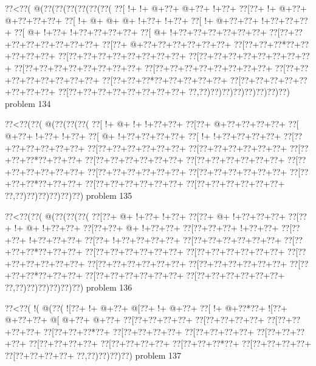 \vbox{\vbox{\goo
\0??<\0??(\- @(\0??(\0??(\0??(\0??(\0??(\0??(
\0??[\- !+\- !+\- @+\0??+\- @+\0??+\- !+\0??+
\0??[\0??+\- !+\- @+\0??+\- @+\0??+\0??+\0??+
\0??[\- !+\- @+\- @+\- @+\- !+\0??+\- !+\0??+
\0??[\- !+\- @+\0??+\0??+\- !+\0??+\0??+\0??+
\0??[\- @+\- !+\0??+\- !+\0??+\0??+\0??+\0??+
\0??[\- @+\- !+\0??+\0??+\0??+\0??+\0??+\0??+
\0??[\0??+\0??+\0??+\0??+\0??+\0??+\0??+\0??+
\0??[\0??+\- @+\0??+\0??+\0??+\0??+\0??+\0??+
\0??[\0??+\0??+\0??*\0??+\0??+\0??+\0??+\0??+
\0??[\0??+\0??+\0??+\0??+\0??+\0??+\0??+\0??+
\0??[\0??+\0??+\0??+\0??+\0??+\0??+\0??+\0??+
\0??[\0??+\0??+\0??+\0??+\0??+\0??+\0??+\0??+
\0??[\0??+\0??+\0??+\0??+\0??+\0??+\0??+\0??+
\0??[\0??+\0??+\0??+\0??+\0??+\0??+\0??+\0??+
\0??[\0??+\0??+\0??*\0??+\0??+\0??+\0??+\0??+
\0??[\0??+\0??+\0??+\0??+\0??+\0??+\0??+\0??+
\0??[\0??+\0??+\0??+\0??+\0??+\0??+\0??+\0??+
\0??,\0??)\0??)\0??)\0??)\0??)\0??)\0??)\0??)
}
\hfil problem 134\hfil\break
}

\vbox{\vbox{\goo
\0??<\0??(\0??(\- @(\0??(\0??(\0??(
\0??[\- !+\- @+\- !+\- !+\0??+\0??+
\0??[\0??+\- @+\0??+\0??+\0??+\0??+
\0??[\- @+\0??+\- !+\0??+\- !+\0??+
\0??[\- @+\- !+\0??+\0??+\0??+\0??+
\0??[\- !+\- !+\0??+\0??+\0??+\0??+
\0??[\0??+\0??+\0??+\0??+\0??+\0??+
\0??[\0??+\0??+\0??+\0??+\0??+\0??+
\0??[\0??+\0??+\0??+\0??+\0??+\0??+
\0??[\0??+\0??+\0??*\0??+\0??+\0??+
\0??[\0??+\0??+\0??+\0??+\0??+\0??+
\0??[\0??+\0??+\0??+\0??+\0??+\0??+
\0??[\0??+\0??+\0??+\0??+\0??+\0??+
\0??[\0??+\0??+\0??+\0??+\0??+\0??+
\0??[\0??+\0??+\0??+\0??+\0??+\0??+
\0??[\0??+\0??+\0??*\0??+\0??+\0??+
\0??[\0??+\0??+\0??+\0??+\0??+\0??+
\0??[\0??+\0??+\0??+\0??+\0??+\0??+
\0??,\0??)\0??)\0??)\0??)\0??)\0??)
}
\hfil problem 135\hfil\break
}

\vbox{\vbox{\goo
\0??<\0??(\0??(\- @(\0??(\0??(\0??(
\0??[\0??+\- @+\- !+\0??+\- !+\0??+
\0??[\0??+\- @+\- !+\0??+\0??+\0??+
\0??[\0??+\- !+\- @+\- !+\0??+\0??+
\0??[\0??+\0??+\- @+\- !+\0??+\0??+
\0??[\0??+\0??+\0??+\- !+\0??+\0??+
\0??[\0??+\0??+\- !+\0??+\0??+\0??+
\0??[\0??+\- !+\0??+\0??+\0??+\0??+
\0??[\0??+\0??+\0??+\0??+\0??+\0??+
\0??[\0??+\0??+\0??*\0??+\0??+\0??+
\0??[\0??+\0??+\0??+\0??+\0??+\0??+
\0??[\0??+\0??+\0??+\0??+\0??+\0??+
\0??[\0??+\0??+\0??+\0??+\0??+\0??+
\0??[\0??+\0??+\0??+\0??+\0??+\0??+
\0??[\0??+\0??+\0??+\0??+\0??+\0??+
\0??[\0??+\0??+\0??*\0??+\0??+\0??+
\0??[\0??+\0??+\0??+\0??+\0??+\0??+
\0??[\0??+\0??+\0??+\0??+\0??+\0??+
\0??,\0??)\0??)\0??)\0??)\0??)\0??)
}
\hfil problem 136\hfil\break
}

\vbox{\vbox{\goo
\0??<\0??(\- !(\- @(\0??(
\- ![\0??+\- !+\- @+\0??+
\- @[\0??+\- !+\- @+\0??+
\0??[\- !+\- @+\0??*\0??+
\- ![\0??+\- @+\0??+\0??+
\- @[\- @+\0??+\- @+\0??+
\0??[\0??+\0??+\0??+\0??+
\0??[\0??+\0??+\0??+\0??+
\0??[\0??+\0??+\0??+\0??+
\0??[\0??+\0??+\0??*\0??+
\0??[\0??+\0??+\0??+\0??+
\0??[\0??+\0??+\0??+\0??+
\0??[\0??+\0??+\0??+\0??+
\0??[\0??+\0??+\0??+\0??+
\0??[\0??+\0??+\0??+\0??+
\0??[\0??+\0??+\0??*\0??+
\0??[\0??+\0??+\0??+\0??+
\0??[\0??+\0??+\0??+\0??+
\0??,\0??)\0??)\0??)\0??)
}
\hfil problem 137\hfil\break
}

